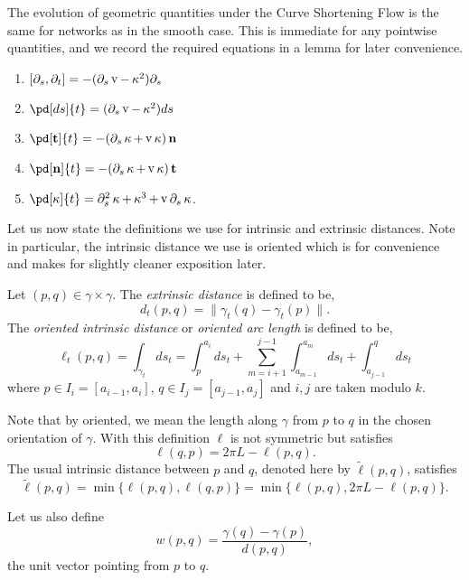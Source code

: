 \documentclass[11pt]{amsart}
\DeclareMathOperator{\tangspeed}{v}
\begin{document}
The evolution of geometric quantities under the Curve Shortening Flow is the same for networks as in the smooth case. This is immediate for any pointwise quantities, and we record the required equations in a lemma for later convenience.

\begin{lemma}
\label{lem:basic_evolution}
\begin{enumerate}
\item \([\partial_s, \partial_t] = -(\partial_s \tangspeed - \curvecurv^2) \partial_s\)
\item \(\pd[ds]{t} = (\partial_s \tangspeed - \curvecurv^2) ds\)
\item \(\pd[\tang]{t} = -(\partial_s \curvecurv + \tangspeed\curvecurv) \nor\)
\item \(\pd[\nor]{t} = -(\partial_s \curvecurv + \tangspeed\curvecurv) \tang\)
\item \(\pd[\curvecurv]{t} = \partial_s^2 \curvecurv + \curvecurv^3 + \tangspeed \partial_s \curvecurv\).
\end{enumerate}
\end{lemma}

Let us now state the definitions we use for intrinsic and extrinsic distances. Note in particular, the intrinsic distance we use is oriented which is for convenience and makes for slightly cleaner exposition later.

\begin{defn}
Let \((p,q) \in \gamma \times \gamma\). The \emph{extrinsic distance} is defined to be,
\[
d_t(p, q) = \|\gamma_t(q) - \gamma_t(p)\|.
\]
The \emph{oriented intrinsic distance} or \emph{oriented arc length} is defined to be,
\[
\ell_t(p, q) = \int_{\gamma_t} ds_t = \int_p^{a_i} ds_t + \sum_{m=i+1}^{j-1} \int_{a_{m-1}}^{a_m} ds_t + \int_{a_{j-1}}^q ds_t
\]
where \(p \in I_i = [a_{i-1}, a_i]\), \(q \in I_j = [a_{j-1}, a_j]\) and \(i,j\) are taken modulo \(k\).
\end{defn}

Note that by oriented, we mean the length along \(\gamma\) from \(p\) to \(q\) in the chosen orientation of \(\gamma\). With this definition \(\ell\) is not symmetric but satisfies
\[
\ell(q, p) = 2\pi L - \ell(p, q).
\]
The usual intrinsic distance between \(p\) and \(q\), denoted here by \(\tilde{\ell}(p, q)\), satisfies
\[
\tilde{\ell}(p, q) = \min\{\ell(p, q), \ell(q, p)\} = \min\{\ell(p, q), 2\pi L - \ell(p, q)\}.
\]

Let us also define
\[
w(p, q) = \frac{\gamma(q) - \gamma(p)}{d(p,q)},
\]
the unit vector pointing from \(p\) to \(q\).
\end{document}
